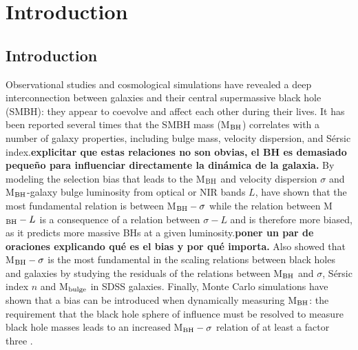\chapter{Introduction}



\section{Introduction}
Observational studies and cosmological simulations have revealed a deep interconnection between galaxies and their central supermassive black hole (SMBH): they appear to coevolve and affect each other during their lives.
It has been reported several times that the SMBH mass (M$_{\rm BH}$) correlates with a number of galaxy properties, including bulge mass, velocity dispersion, and S\'{e}rsic index.{\bf explicitar que estas relaciones no son obvias, el BH es demasiado pequeño para influenciar directamente la dinámica de la galaxia.} %
By modeling the selection bias that leads to the M$_{\rm BH}$ and velocity dispersion $\sigma$ and M$_{\rm BH}$-galaxy bulge luminosity from optical or NIR bands $L$, \citet{2007ApJ...660..267B} have shown that the most fundamental relation is between M$_{\rm BH}-\sigma$ while the relation between M$_{\rm BH}- L$ is a consequence of a relation between $\sigma-L$ and is therefore more biased, as it predicts more massive BHs at a given luminosity.{\bf poner un par de oraciones explicando qué es el bias y por qué importa.} Also \citet{2017MNRAS.466.4029S} showed that M$_{\rm BH}-\sigma$ is the most fundamental in the scaling relations between black holes and galaxies by studying the residuals of the relations between M$_{\rm BH}$ and $\sigma$, S\'{e}rsic index $n$ and M$_{\rm bulge}$ in SDSS galaxies. Finally, Monte Carlo simulations have shown that a bias can be introduced when dynamically measuring M$_{\rm BH}$: the requirement that the black hole sphere of influence must be resolved to measure black hole masses leads to an increased M$_{\rm BH}-\sigma$ relation of at least a factor three \citep{2016MNRAS.460.3119S}.
